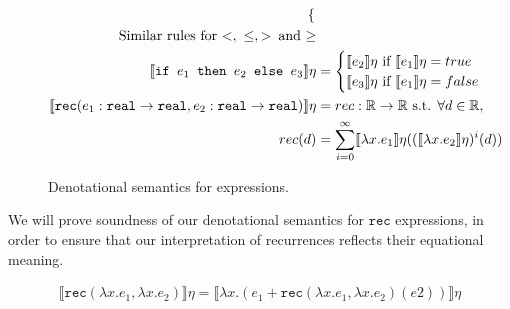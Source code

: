 \begin{figure}
\begin{align*}
\begin{cases}
   \end{cases}
 \\
\text{Similar rules for $<, \ \leq , >$\, and $\geq$} \\
  \llbracket \texttt{if } e_1 \texttt{ then } e_2 \texttt{ else } e_3 \rrbracket \eta &= 
 \begin{cases} 
      \llbracket e_2 \rrbracket\eta \text{ if } \llbracket e_1 \rrbracket\eta = true \\
      \llbracket e_3 \rrbracket\eta \text{ if } \llbracket e_1 \rrbracket\eta = false \\
   \end{cases}
  \\
   \llbracket  \texttt{rec} (e_1 : \texttt{real} \rightarrow \texttt{real}, e_2 : \texttt{real} \rightarrow \texttt{real}) \rrbracket\eta &= rec : \mathbb{R} \rightarrow \mathbb{R} \text{ s.t. } \forall d \in \mathbb{R}, \\
   rec(d) &= \sum_{i=0}^{\infty}\llbracket \lambda x.e_1 \rrbracket\eta ((\llbracket \lambda x.e_2 \rrbracket\eta)^i(d))
 \end{align*}
 \caption{Denotational semantics for expressions.}
 \label{fig:densemexps}
 \end{figure}
 
  We will prove soundness of our denotational semantics for $\texttt{rec}$ expressions, in order to ensure that
 our interpretation of recurrences reflects their equational meaning.
 \begin{thm}
 \begin{align*}
 \llbracket \texttt{rec}(\lambda x.e_1, \lambda x.e_2) \rrbracket \eta 
 = \llbracket \lambda x.(e_1 + \texttt{rec}(\lambda x.e_1, \lambda x.e_2)(e2)) \rrbracket \eta
 \end{align*} 
 \end{thm}
 
